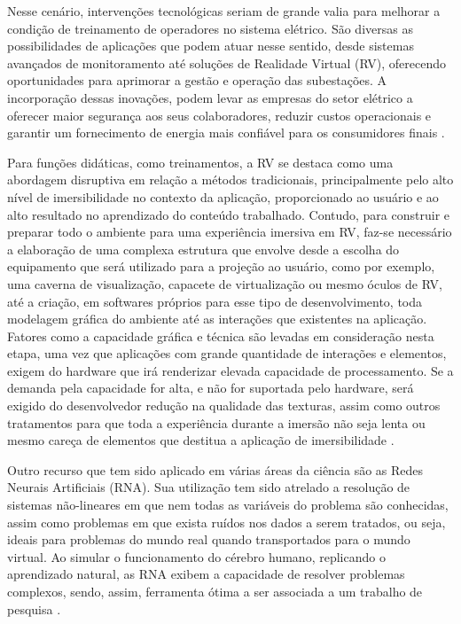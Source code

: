 Nesse cenário, intervenções tecnológicas seriam de grande valia para melhorar a condição de treinamento de operadores no sistema elétrico. São diversas as possibilidades de aplicações que podem atuar nesse sentido, desde sistemas avançados de monitoramento até soluções de Realidade Virtual (RV), oferecendo oportunidades para aprimorar a gestão e operação das subestações. A incorporação dessas inovações, podem levar as empresas do setor elétrico a oferecer maior segurança aos seus colaboradores, reduzir custos operacionais e garantir um fornecimento de energia mais confiável para os consumidores finais  \cite{zhou2016big}.

Para funções didáticas, como treinamentos, a RV se destaca como uma abordagem disruptiva em relação a métodos tradicionais, principalmente pelo alto nível de imersibilidade no contexto da aplicação, proporcionado ao usuário e ao alto resultado no aprendizado do conteúdo trabalhado. Contudo, para construir e preparar todo o ambiente para uma experiência imersiva em RV, faz-se necessário a elaboração de uma complexa estrutura que envolve desde a escolha do equipamento que será utilizado para a projeção ao usuário, como por exemplo, uma caverna de visualização, capacete de virtualização ou mesmo óculos de RV, até a criação, em softwares próprios para esse tipo de desenvolvimento, toda modelagem gráfica do ambiente até as interações que existentes na aplicação. Fatores como a capacidade gráfica e técnica são levadas em consideração nesta etapa, uma vez que aplicações com grande quantidade de interações e elementos, exigem do hardware que irá renderizar elevada capacidade de processamento. Se a demanda pela capacidade for alta, e não for suportada pelo hardware, será exigido do desenvolvedor redução na qualidade das texturas, assim como outros tratamentos para que toda a experiência durante a imersão não seja lenta ou mesmo careça de elementos que destitua a aplicação de imersibilidade \cite{palmeira2020uncanny}. 

Outro recurso que tem sido aplicado em várias áreas da ciência são as Redes Neurais Artificiais (RNA). Sua utilização tem sido atrelado a resolução de sistemas não-lineares em que nem todas as variáveis do problema são conhecidas, assim como problemas em que exista ruídos nos dados a serem tratados, ou seja, ideais para problemas do mundo real quando transportados para o mundo virtual. Ao simular o funcionamento do cérebro humano, replicando o aprendizado natural, as RNA exibem a capacidade de resolver problemas complexos, sendo, assim, ferramenta ótima a ser associada a um trabalho de pesquisa  \cite{ougcu2012forecasting}.

